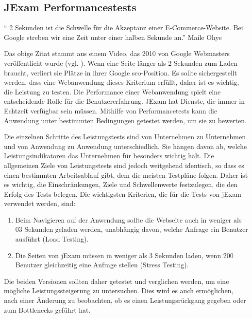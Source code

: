 \subsection{JExam Performancestests}\label{ch:perform}

\begin{center}
`` 2 Sekunden ist die Schwelle f\"ur die Akzeptanz einer E-Commerce-Website.
Bei Google streben wir eine Zeit unter einer halben Sekunde an.'' Maile Ohye
\end{center}
\>

Das obige Zitat stammt aus einem Video, das 2010 von Google Webmasters
ver\"offentlicht wurde (vgl. \cite{Ohye2010}). Wenn eine Seite l\"anger
als 2 Sekunden zum Laden braucht, verliert sie Pl\"atze in ihrer Google
\acs{seo}-Position. Es sollte sichergestellt werden, dass eine
Webanwendung dieses Kriterium erfüllt, daher ist es wichtig,
die Leistung zu testen. Die Performance einer Webanwendung spielt eine
entscheidende Rolle f\"ur die Benutzererfahrung. JExam hat Dienste,
die immer in Echtzeit verf\"ugbar sein m\"ussen. Mithilfe von 
Performancetests kann die Anwendung unter bestimmten Bedingungen 
getestet werden, um sie zu bewerten.

Die einzelnen Schritte des Leistungstests sind von Unternehmen
zu Unternehmen und von Anwendung zu Anwendung unterschiedlich.
Sie hängen davon ab, welche Leistungsindikatoren das Unternehmen für
besonders wichtig hält. Die allgemeinen Ziele von Leistungstests
sind jedoch weitgehend identisch, so dass es einen bestimmten
Arbeitsablauf gibt, dem die meisten Testpläne folgen. Daher ist es
wichtig, die Einschränkungen, Ziele und Schwellenwerte festzulegen,
die den Erfolg des Tests belegen. Die wichtigsten Kriterien,
die für die Tests von jExam verwendet werden, sind:

\noindent
\begin{enumerate}
    \item Beim Navigieren auf der Anwendung sollte die Webseite auch in
    weniger als 03 Sekunden geladen werden, unabhängig davon, welche Anfrage
    ein Benutzer ausführt (Load Testing).
    \item Die Seiten von jExam müssen in weniger als 3 Sekunden laden,
    wenn 200 Benutzer gleichzeitig eine Anfrage stellen (Stress Testing).
\end{enumerate}

Die beiden Versionen sollten daher getestet und verglichen werden,
um eine mögliche Leistungssteigerung zu untersuchen.
Dies wird es auch ermöglichen, nach einer \"Anderung zu beobachten, ob
es einen Leistungsrückgang gegeben oder zum Bottlenecks geführt hat.